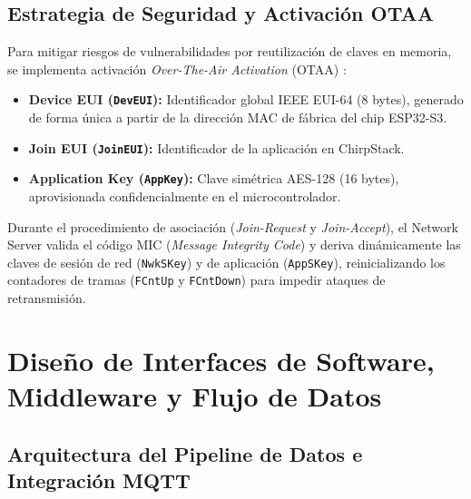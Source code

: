 \documentclass[12pt,oneside,openany,spanish,oldfontcommands]{memoir}
\begin{document}
\subsection{Estrategia de Seguridad y Activación OTAA}

Para mitigar riesgos de vulnerabilidades por reutilización de claves en memoria, se implementa
activación \textit{Over-The-Air Activation} (OTAA) \parencite{lorawan1_0_4}:
\begin{itemize}
    \item \textbf{Device EUI (\texttt{DevEUI}):} Identificador global IEEE EUI-64 (8 bytes), generado
    de forma única a partir de la dirección MAC de fábrica del chip ESP32-S3.
    \item \textbf{Join EUI (\texttt{JoinEUI}):} Identificador de la aplicación en ChirpStack.
    \item \textbf{Application Key (\texttt{AppKey}):} Clave simétrica AES-128 (16 bytes),
    aprovisionada confidencialmente en el microcontrolador.
\end{itemize}
Durante el procedimiento de asociación (\textit{Join-Request} y \textit{Join-Accept}), el Network
Server valida el código MIC (\textit{Message Integrity Code}) y deriva dinámicamente las claves de
sesión de red (\texttt{NwkSKey}) y de aplicación (\texttt{AppSKey}), reinicializando los contadores
de tramas (\texttt{FCntUp} y \texttt{FCntDown}) para impedir ataques de retransmisión.

\section{Diseño de Interfaces de Software, Middleware y Flujo de Datos}\label{sec:interfaces-software}

\subsection{Arquitectura del Pipeline de Datos e Integración MQTT}
\end{document}
